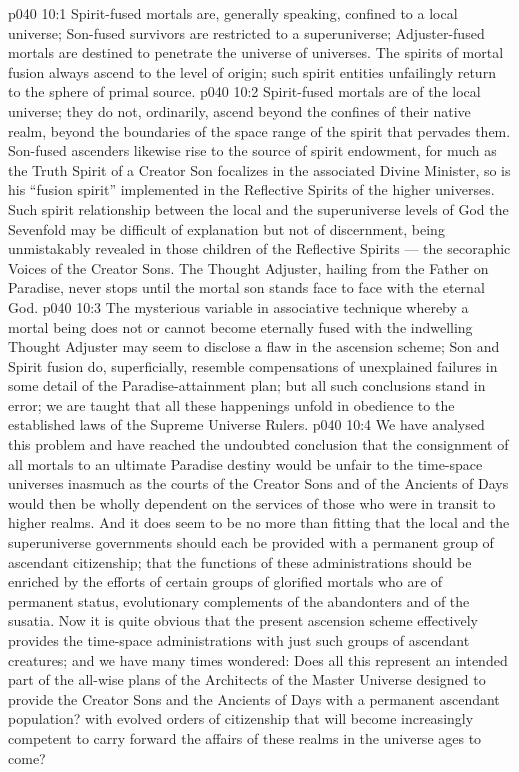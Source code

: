\vs p040 10:1 Spirit\hyp{}fused mortals are, generally speaking, confined to a local universe; Son\hyp{}fused survivors are restricted to a superuniverse; Adjuster\hyp{}fused mortals are destined to penetrate the universe of universes. The spirits of mortal fusion always ascend to the level of origin; such spirit entities unfailingly return to the sphere of primal source.
\vs p040 10:2 Spirit\hyp{}fused mortals are of the local universe; they do not, ordinarily, ascend beyond the confines of their native realm, beyond the boundaries of the space range of the spirit that pervades them. Son\hyp{}fused ascenders likewise rise to the source of spirit endowment, for much as the Truth Spirit of a Creator Son focalizes in the associated Divine Minister, so is his “fusion spirit” implemented in the Reflective Spirits of the higher universes. Such spirit relationship between the local and the superuniverse levels of God the Sevenfold may be difficult of explanation but not of discernment, being unmistakably revealed in those children of the Reflective Spirits --- the secoraphic Voices of the Creator Sons. The Thought Adjuster, hailing from the Father on Paradise, never stops until the mortal son stands face to face with the eternal God.
\vs p040 10:3 \pc The mysterious variable in associative technique whereby a mortal being does not or cannot become eternally fused with the indwelling Thought Adjuster may seem to disclose a flaw in the ascension scheme; Son and Spirit fusion do, superficially, resemble compensations of unexplained failures in some detail of the Paradise\hyp{}attainment plan; but all such conclusions stand in error; we are taught that all these happenings unfold in obedience to the established laws of the Supreme Universe Rulers.
\vs p040 10:4 We have analysed this problem and have reached the undoubted conclusion that the consignment of all mortals to an ultimate Paradise destiny would be unfair to the time\hyp{}space universes inasmuch as the courts of the Creator Sons and of the Ancients of Days would then be wholly dependent on the services of those who were in transit to higher realms. And it does seem to be no more than fitting that the local and the superuniverse governments should each be provided with a permanent group of ascendant citizenship; that the functions of these administrations should be enriched by the efforts of certain groups of glorified mortals who are of permanent status, evolutionary complements of the abandonters and of the susatia. Now it is quite obvious that the present ascension scheme effectively provides the time\hyp{}space administrations with just such groups of ascendant creatures; and we have many times wondered: Does all this represent an intended part of the all\hyp{}wise plans of the Architects of the Master Universe designed to provide the Creator Sons and the Ancients of Days with a permanent ascendant population? with evolved orders of citizenship that will become increasingly competent to carry forward the affairs of these realms in the universe ages to come?
